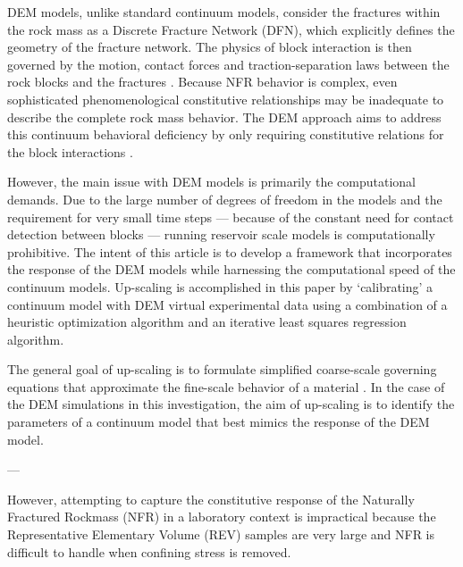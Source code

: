DEM models, unlike standard continuum models, consider the fractures within the rock mass as a Discrete Fracture Network (DFN), which explicitly defines the geometry of the fracture network. The physics of block interaction is then governed by the motion, contact forces and traction-separation laws between the rock blocks and the fractures \citep{Cundall_1979}. Because NFR behavior is complex, even sophisticated phenomenological constitutive relationships may be inadequate to describe the complete rock mass behavior. The DEM approach aims to address this continuum behavioral deficiency by only requiring constitutive relations for the block interactions \citep{Cundall_2001}.

However, the main issue with DEM models is primarily the computational demands. Due to the large number of degrees of freedom in the models and the requirement for very small time steps — because of the constant need for contact detection between blocks — running reservoir scale models is computationally prohibitive. The intent of this article is to develop a framework that incorporates the response of the DEM models while harnessing the computational speed of the continuum models. Up-scaling is accomplished in this paper by ‘calibrating’ a continuum model with DEM virtual experimental data using a combination of a heuristic optimization algorithm and an iterative least squares regression algorithm.

The general goal of up-scaling is to formulate simplified coarse-scale governing equations that approximate the fine-scale behavior of a material \citep{Geers_2010}. In the case of the DEM simulations in this investigation, the aim of up-scaling is to identify the parameters of a continuum model that best mimics the response of the DEM model.

---

However, attempting to capture the constitutive response of the Naturally Fractured Rockmass (NFR) in a laboratory context is impractical because the Representative Elementary Volume (REV) samples are very large and NFR is difficult to handle when confining stress is removed.

